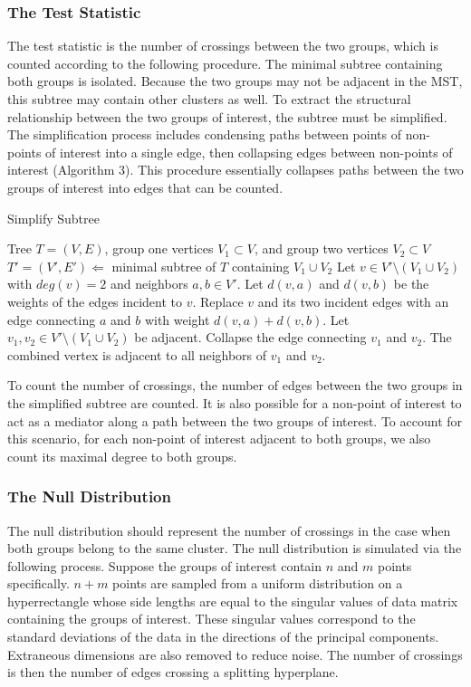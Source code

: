 \documentclass{article}
\begin{document}
\subsubsection{The Test Statistic}
The test statistic is the number of crossings between the two groups, which is counted according to the following procedure. The minimal subtree containing both groups is isolated. Because the two groups may not be adjacent in the MST, this subtree may contain other clusters as well. To extract the structural relationship between the two groups of interest, the subtree must be simplified. The simplification process includes condensing paths between points of non-points of interest into a single edge, then collapsing edges between non-points of interest (Algorithm 3).  This procedure essentially collapses paths between the two groups of interest into edges that can be counted.

\begin{algorithm}[H]
\caption{Simplify Subtree}\label{algo3}
\begin{algorithmic}[3]
\Require Tree $T = (V,E)$, group one vertices $V_1 \subset V$, and group two vertices $V_2 \subset V$
\State $T' = (V', E') \Leftarrow$ minimal subtree of $T$ containing $V_1 \cup V_2$
\Repeat
	\State Let $v \in V' \setminus (V_1 \cup V_2)$ with $deg(v) = 2$ and neighbors $a, b \in V'$. Let $d(v, a)$ and $d(v, b)$ be the weights of the edges incident to $v$.
	\State Replace $v$ and its two incident edges with an edge connecting $a$ and $b$ with weight $d(v, a) + d(v, b)$.
\Repeat
	\State Let $v_1, v_2 \in V' \setminus (V_1 \cup V_2)$ be adjacent.
	\State Collapse the edge connecting $v_1$ and $v_2$. The combined vertex is adjacent to all neighbors of $v_1$ and $v_2$.
\end{algorithmic}
\end{algorithm}

To count the number of crossings, the number of edges between the two groups in the simplified subtree are counted. It is also possible for a non-point of interest to act as a mediator along a path between the two groups of interest. To account for this scenario, for each non-point of interest adjacent to both groups, we also count its maximal degree to both groups.

\subsubsection{The Null Distribution}
The null distribution should represent the number of crossings in the case when both groups belong to the same cluster. The null distribution is simulated via the following process. Suppose the groups of interest contain $n$ and $m$ points specifically. $n+m$ points are sampled from a uniform distribution on a hyperrectangle whose side lengths are equal to the singular values of data matrix containing the groups of interest. These singular values correspond to the standard deviations of the data in the directions of the principal components. Extraneous dimensions are also removed to reduce noise. The number of crossings is then the number of edges crossing a splitting hyperplane.
\end{document}
